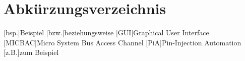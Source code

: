 \section*{Abkürzungsverzeichnis}
\begin{acronym}[MICBAC]
[bsp.]{Beispiel}
[bzw.]{beziehungsweise}
[GUI]{Graphical User Interface}
[MICBAC]{Micro System Bus Access Channel}
[PiA]{Pin-Injection Automation}
[z.B.]{zum Beispiel}
\end{acronym}
